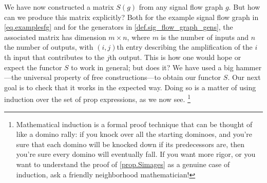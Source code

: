 \documentclass[7Sketches]{subfiles}
\begin{document}
We have now constructed a matrix $S(g)$ from any signal flow graph $g$. But how can we produce this matrix explicitly? Both for the example signal flow graph in \cref{eq.examplesfg}
and for the generators in \cref{def.sig_flow_graph_gens}, the associated matrix
has dimension $m\times n$, where $m$ is the number of inputs and $n$ the number of outputs,
with $(i,j)$th entry describing the amplification of the $i$th input that
contributes to the $j$th output. This is how one would hope or expect the
functor $S$ to work in general; but does it? We have used a big hammer---the
universal property of free constructions---to obtain our functor $S$. Our next
goal is to check that it works in the expected way. Doing so is a matter of
using induction over the set of prop expressions, as we now see.%
\footnote{Mathematical induction is a formal proof technique that can be thought of like a domino rally: if you knock over all the starting dominoes, and you're sure that each domino will be knocked down if its predecessors are, then you're sure every domino will eventually fall. If you want more rigor, or you want to understand the proof of \cref{prop.Simages} as a genuine case of induction, ask a friendly neighborhood mathematician!}%
\end{document}
